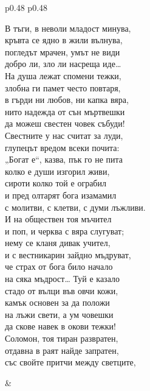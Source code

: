 \documentclass[12pt,a4paper]{article}
\renewcommand{\arraystretch}{1.2}
\begin{document}
\begin{table}[h]
\centering
\renewcommand{\arraystretch}{1.2}
\begin{tabular}{p{0.48\textwidth} p{0.48\textwidth}}

\begin{minipage}[t]{\linewidth}

В тъги, в неволи младост минува,\\
кръвта се ядно в жили вълнува,\\
погледът мрачен, умът не види\\
добро ли, зло ли насреща иде…\\
На душа лежат спомени тежки,\\
злобна ги памет често повтаря,\\
в гърди ни любов, ни капка вяра,\\
нито надежда от сън мъртвешки\\
да можеш свестен човек събуди!\\
Свестните у нас считат за луди,\\
глупецът вредом всеки почита:\\
„Богат е“, казва, пък го не пита\\
колко е души изгорил живи,\\
сироти колко той е ограбил\\
и пред олтарят бога изамамил\\
с молитви, с клетви, с думи лъжливи.\\
И на обществен тоя мъчител\\
и поп, и черква с вяра слугуват;\\
нему се кланя дивак учител,\\
и с вестникарин зайдно мъдруват,\\
че страх от бога било начало\\
на сяка мъдрост… Туй е казало\\
стадо от вълци във овчи кожи,\\
камък основен за да положи\\
на лъжи свети, а ум човешки\\
да скове навек в окови тежки!\\
Соломон, тоя тиран развратен,\\
отдавна в раят найде запратен,\\
със свойте притчи между светците,\\


\end{minipage}

&


\end{tabular}
\end{table}
\end{document}
